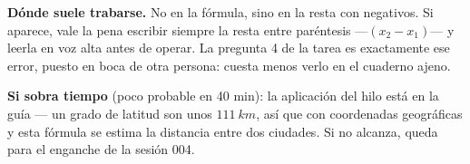 \documentclass[11pt]{article}
\begin{document}
\begin{nota}
\textbf{Dónde suele trabarse.} No en la fórmula, sino en la resta con negativos. Si aparece,
vale la pena escribir siempre la resta entre paréntesis —$(x_2 - x_1)$— y leerla en voz alta
antes de operar. La pregunta 4 de la tarea es exactamente ese error, puesto en boca de otra
persona: cuesta menos verlo en el cuaderno ajeno.
\end{nota}

\begin{nota}
\textbf{Si sobra tiempo} (poco probable en 40 min): la aplicación del hilo está en la guía —
un grado de latitud son unos $\qty{111}{km}$, así que con coordenadas geográficas y esta
fórmula se estima la distancia entre dos ciudades. Si no alcanza, queda para el enganche de
la sesión 004.
\end{nota}
\end{document}
